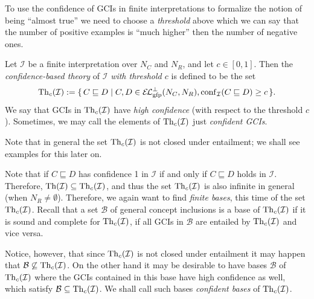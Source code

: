 To use the confidence of GCIs in finite interpretations to formalize the notion of being
``almost true'' we need to choose a \emph{threshold} above which we can say that the
number of positive examples is ``much higher'' then the number of negative ones.

\begin{Definition}
  \label{def:confident-theory-of-interpretations}
  Let $\mathcal{I}$ be a finite interpretation over $N_C$ and $N_R$, and let $c \in [0,
  1]$.  Then the \emph{confidence-based theory} of $\mathcal{I}$ \emph{with threshold $c$}
  is defined to be the set
  \begin{equation*}
    \operatorname{Th}_c(\mathcal{I}) := {\{\, C \sqsubseteq D \mid C, D \in {\ensuremath{{\mathcal{E}\kern-.3ex\mathcal{L}}_\text{gfp}^\bot}}(N_C, N_R),
      \operatorname{conf}_{\mathcal{I}}( C \sqsubseteq D ) \ge c \,\}}.
  \end{equation*}
  We say that GCIs in $\operatorname{Th}_c(\mathcal{I})$ have \emph{high confidence} (with respect to
  the threshold $c$).  Sometimes, we may call the elements of $\operatorname{Th}_c(\mathcal{I})$ just
  \emph{confident GCIs}.
\end{Definition}

Note that in general the set $\operatorname{Th}_c(\mathcal{I})$ is not closed under entailment; we shall
see examples for this later on.

Note that if $C \sqsubseteq D$ has confidence 1 in $\mathcal{I}$ if and only if $C
\sqsubseteq D$ holds in $\mathcal{I}$.  Therefore, $\operatorname{Th}(\mathcal{I}) \subseteq
\operatorname{Th}_c(\mathcal{I})$, and thus the set $\operatorname{Th}_c(\mathcal{I})$ is also infinite in general
(\ie when $N_R \neq \emptyset$).  Therefore, we again want to find \emph{finite bases},
this time of the set $\operatorname{Th}_c(\mathcal{I})$.  Recall that a set $\mathcal{B}$ of general
concept inclusions is a base of $\operatorname{Th}_c(\mathcal{I})$ if it is sound and complete for
$\operatorname{Th}_c(\mathcal{I})$, \ie if all GCIs in $\mathcal{B}$ are entailed by
$\operatorname{Th}_c(\mathcal{I})$ and vice versa.

Notice, however, that since $\operatorname{Th}_c(\mathcal{I})$ is not closed under entailment it may
happen that $\mathcal{B} \not\subseteq \operatorname{Th}_c(\mathcal{I})$.  On the other hand it may be
desirable to have bases $\mathcal{B}$ of $\operatorname{Th}_c(\mathcal{I})$ where the GCIs contained in
this base have high confidence as well, \ie which satisfy $\mathcal{B} \subseteq
\operatorname{Th}_c(\mathcal{I})$.  We shall call such bases \emph{confident bases} of
$\operatorname{Th}_c(\mathcal{I})$.

